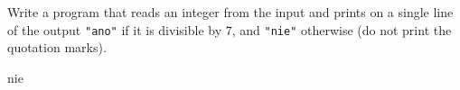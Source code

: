 




Write a program that reads an integer from the input and prints on a single line of the output \texttt{"ano"} if it is divisible by $7$, and \texttt{"nie"} otherwise (do not print the quotation marks).

\vystup
nie
\koniec

